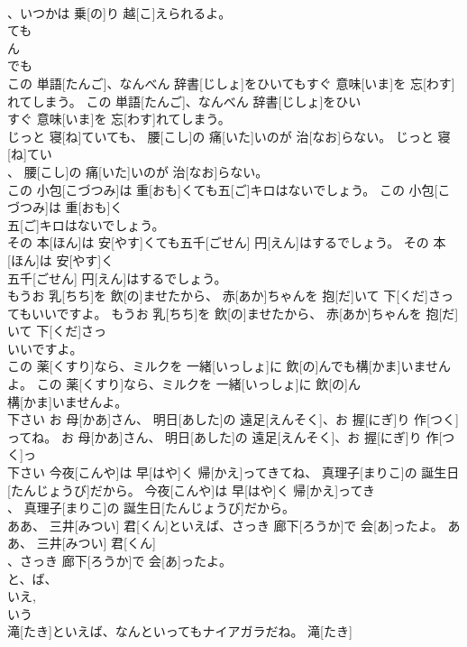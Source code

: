 \documentclass[8pt]{extreport}
\begin{document}
\begin{CJK}{UTF8}{min}
\\	、いつかは 乗[の]り 越[こ]えられるよ。	
\\	ても 
\\	ん 
\\	でも 
\\	この 単語[たんご]、なんべん 辞書[じしょ]をひいてもすぐ 意味[いま]を 忘[わす]れてしまう。	この 単語[たんご]、なんべん 辞書[じしょ]をひい
\\	すぐ 意味[いま]を 忘[わす]れてしまう。	
\\	じっと 寝[ね]ていても、 腰[こし]の 痛[いた]いのが 治[なお]らない。	じっと 寝[ね]てい
\\	、 腰[こし]の 痛[いた]いのが 治[なお]らない。	
\\	この 小包[こづつみ]は 重[おも]くても五[ご]キロはないでしょう。	この 小包[こづつみ]は 重[おも]く
\\	五[ご]キロはないでしょう。	
\\	その 本[ほん]は 安[やす]くても五千[ごせん] 円[えん]はするでしょう。	その 本[ほん]は 安[やす]く
\\	五千[ごせん] 円[えん]はするでしょう。	
\\	もうお 乳[ちち]を 飲[の]ませたから、 赤[あか]ちゃんを 抱[だ]いて 下[くだ]さってもいいですよ。	もうお 乳[ちち]を 飲[の]ませたから、 赤[あか]ちゃんを 抱[だ]いて 下[くだ]さっ
\\	いいですよ。	
\\	この 薬[くすり]なら、ミルクを 一緒[いっしょ]に 飲[の]んでも構[かま]いませんよ。	この 薬[くすり]なら、ミルクを 一緒[いっしょ]に 飲[の]ん
\\	構[かま]いませんよ。	
\\	下さい	お 母[かあ]さん、 明日[あした]の 遠足[えんそく]、お 握[にぎ]り 作[つく]ってね。	お 母[かあ]さん、 明日[あした]の 遠足[えんそく]、お 握[にぎ]り 作[つく]っ
\\	下さい	今夜[こんや]は 早[はや]く 帰[かえ]ってきてね、 真理子[まりこ]の 誕生日[たんじょうび]だから。	今夜[こんや]は 早[はや]く 帰[かえ]ってき
\\	、 真理子[まりこ]の 誕生日[たんじょうび]だから。	
\\	ああ、 三井[みつい] 君[くん]といえば、さっき 廊下[ろうか]で 会[あ]ったよ。	ああ、 三井[みつい] 君[くん]
\\	、さっき 廊下[ろうか]で 会[あ]ったよ。	
\\	と、ば、
\\	いえ, 
\\	いう
\\	滝[たき]といえば、なんといってもナイアガラだね。	滝[たき]

\end{CJK}
\end{document}
